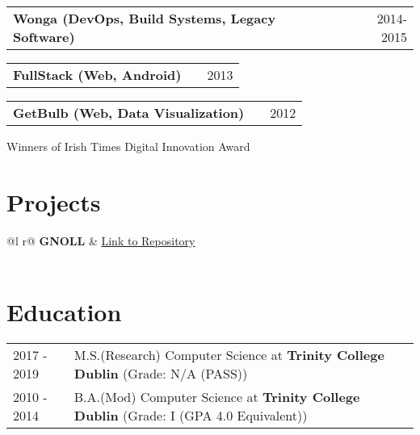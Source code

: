 \documentclass[a4paper,12pt]{article}
\makeatletter
\newenvironment{jobshort}[2]
    {
    \begin{tabularx}{\linewidth}{@{}l X r@{}}
    \textbf{#1} & \hfill &  #2 \\[3.75pt]
    \end{tabularx}
    }
    {
    }
\makeatother
\begin{document}
\begin{jobshort}{Wonga (DevOps, Build Systems, Legacy Software)}{2014-2015}
\end{jobshort}
\begin{jobshort}{FullStack (Web, Android)}{2013}
\end{jobshort}
\begin{jobshort}{GetBulb (Web, Data Visualization)}{2012}
Winners of Irish Times Digital Innovation Award
\end{jobshort}
  
\section{Projects}

\begin{tabularx}{\linewidth}{ @{}l r@{} }
\textbf{GNOLL} & \hfill \href{https://github.com/ianfhunter/GNOLL}{Link to Repository} \\[3.75pt]
  \\
\end{tabularx}

\section{Education}
\begin{tabularx}{\linewidth}{@{}l X@{}}	
2017 - 2019 & M.S.(Research) Computer Science at \textbf{Trinity College Dublin} \hfill \normalsize (Grade: N/A (PASS)) \\

2010 - 2014 & B.A.(Mod) Computer Science at \textbf{Trinity College Dublin} \hfill \normalsize (Grade: I (GPA 4.0 Equivalent)) \\
\end{tabularx}
\end{document}
